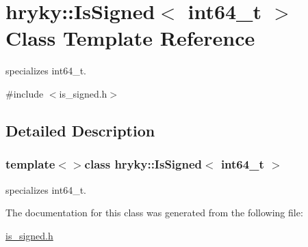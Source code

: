 \hypertarget{classhryky_1_1_is_signed_3_01int64__t_01_4}{\section{hryky\-:\-:Is\-Signed$<$ int64\-\_\-t $>$ Class Template Reference}
\label{classhryky_1_1_is_signed_3_01int64__t_01_4}
}


specializes int64\-\_\-t.  




{\ttfamily \#include $<$is\-\_\-signed.\-h$>$}



\subsection{Detailed Description}
\subsubsection*{template$<$$>$class hryky\-::\-Is\-Signed$<$ int64\-\_\-t $>$}

specializes int64\-\_\-t. 

The documentation for this class was generated from the following file\-:\begin{DoxyCompactItemize}
\item 
\hyperlink{is__signed_8h}{is\-\_\-signed.\-h}\end{DoxyCompactItemize}
